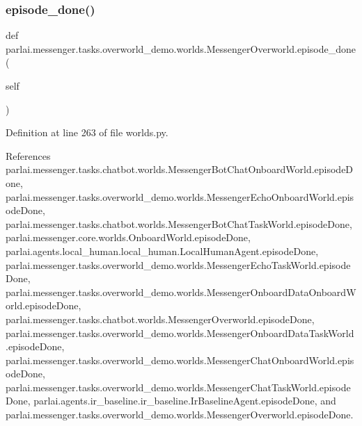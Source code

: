 \subsubsection{\texorpdfstring{episode\+\_\+done()}{episode\_done()}}
{\footnotesize\ttfamily def parlai.\+messenger.\+tasks.\+overworld\+\_\+demo.\+worlds.\+Messenger\+Overworld.\+episode\+\_\+done (\begin{DoxyParamCaption}\item[{}]{self }\end{DoxyParamCaption})}



Definition at line 263 of file worlds.\+py.



References parlai.\+messenger.\+tasks.\+chatbot.\+worlds.\+Messenger\+Bot\+Chat\+Onboard\+World.\+episode\+Done, parlai.\+messenger.\+tasks.\+overworld\+\_\+demo.\+worlds.\+Messenger\+Echo\+Onboard\+World.\+episode\+Done, parlai.\+messenger.\+tasks.\+chatbot.\+worlds.\+Messenger\+Bot\+Chat\+Task\+World.\+episode\+Done, parlai.\+messenger.\+core.\+worlds.\+Onboard\+World.\+episode\+Done, parlai.\+agents.\+local\+\_\+human.\+local\+\_\+human.\+Local\+Human\+Agent.\+episode\+Done, parlai.\+messenger.\+tasks.\+overworld\+\_\+demo.\+worlds.\+Messenger\+Echo\+Task\+World.\+episode\+Done, parlai.\+messenger.\+tasks.\+overworld\+\_\+demo.\+worlds.\+Messenger\+Onboard\+Data\+Onboard\+World.\+episode\+Done, parlai.\+messenger.\+tasks.\+chatbot.\+worlds.\+Messenger\+Overworld.\+episode\+Done, parlai.\+messenger.\+tasks.\+overworld\+\_\+demo.\+worlds.\+Messenger\+Onboard\+Data\+Task\+World.\+episode\+Done, parlai.\+messenger.\+tasks.\+overworld\+\_\+demo.\+worlds.\+Messenger\+Chat\+Onboard\+World.\+episode\+Done, parlai.\+messenger.\+tasks.\+overworld\+\_\+demo.\+worlds.\+Messenger\+Chat\+Task\+World.\+episode\+Done, parlai.\+agents.\+ir\+\_\+baseline.\+ir\+\_\+baseline.\+Ir\+Baseline\+Agent.\+episode\+Done, and parlai.\+messenger.\+tasks.\+overworld\+\_\+demo.\+worlds.\+Messenger\+Overworld.\+episode\+Done.

\mbox{\label{classparlai_1_1messenger_1_1tasks_1_1overworld__demo_1_1worlds_1_1MessengerOverworld_a867110fef788b354e768b44e0a22d6ed}} 
